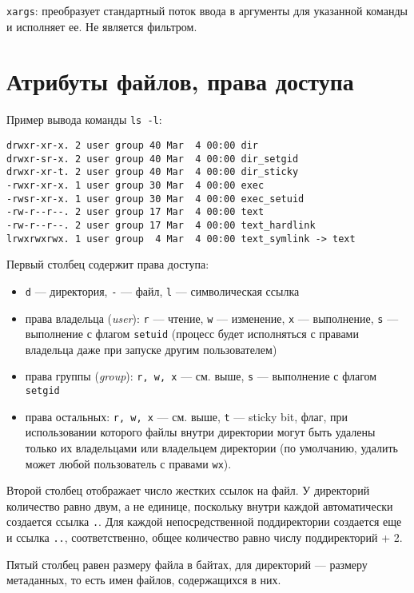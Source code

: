 \documentclass[listings]{labreport}
\begin{document}
\texttt{xargs}: преобразует стандартный поток ввода в аргументы для указанной команды и исполняет ее.
Не является фильтром.

\section*{Атрибуты файлов, права доступа}

Пример вывода команды \texttt{ls -l}:

\begin{verbatim}
drwxr-xr-x. 2 user group 40 Mar  4 00:00 dir
drwxr-sr-x. 2 user group 40 Mar  4 00:00 dir_setgid
drwxr-xr-t. 2 user group 40 Mar  4 00:00 dir_sticky
-rwxr-xr-x. 1 user group 30 Mar  4 00:00 exec
-rwsr-xr-x. 1 user group 30 Mar  4 00:00 exec_setuid
-rw-r--r--. 2 user group 17 Mar  4 00:00 text
-rw-r--r--. 2 user group 17 Mar  4 00:00 text_hardlink
lrwxrwxrwx. 1 user group  4 Mar  4 00:00 text_symlink -> text
\end{verbatim}

Первый столбец содержит права доступа:
\begin{itemize}
\item \texttt{d} — директория, \texttt{-} — файл, \texttt{l} — символическая ссылка
\item права владельца (\textit{user}): \texttt{r} — чтение, \texttt{w} — изменение, \texttt{x} — выполнение,
  \texttt{s} — выполнение с флагом \texttt{setuid} (процесс будет исполняться с правами владельца даже при запуске другим пользователем)
\item права группы (\textit{group}): \texttt{r, w, x} — см. выше, \texttt{s} — выполнение с флагом \texttt{setgid}
\item права остальных: \texttt{r, w, x} — см. выше, \texttt{t} — sticky bit, флаг, при использовании которого файлы внутри директории
  могут быть удалены только их владельцами или владельцем директории (по умолчанию, удалить может любой пользователь с правами \texttt{wx}).
\end{itemize}

Второй столбец отображает число жестких ссылок на файл. У директорий количество равно двум, а не единице, поскольку внутри
каждой автоматически создается ссылка \texttt{.}. Для каждой непосредственной поддиректории создается еще и ссылка \texttt{..},
соответственно, общее количество равно числу поддиректорий + 2.

Пятый столбец равен размеру файла в байтах, для директорий — размеру метаданных, то есть имен файлов, содержащихся в них.
\end{document}
